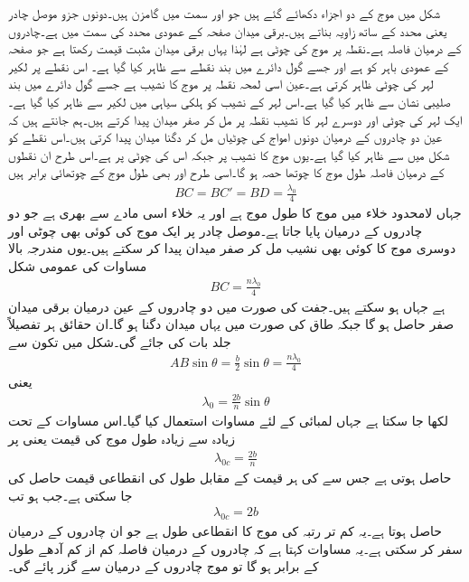 شکل  میں  موج کے دو  اجزاء دکھائے گئے ہیں جو  اور  سمت میں گامزن ہیں۔دونوں جزو موصل چادر یعنی  محدد کے ساتھ  زاویہ بناتے ہیں۔برقی میدان صفحہ کے عمودی  محدد کی سمت میں ہے۔چادروں کے درمیان فاصلہ  ہے۔نقطہ  پر موج  کی چوٹی ہے لہٰذا یہاں برقی میدان  مثبت  قیمت رکھتا ہے جو صفحہ کے عمودی باہر کو ہے اور جسے گول دائرے میں بند نقطے سے ظاہر کیا گیا ہے۔ اس نقطے پر لکیر  لہر کی چوٹی ظاہر کرتی ہے۔عین اسی لمحہ نقطہ  پر موج  کا نشیب ہے جسے گول دائرے میں بند صلیبی نشان سے ظاہر کیا گیا ہے۔اس لہر کے نشیب کو ہلکی سیاہی میں لکیر  سے ظاہر کیا گیا ہے۔ایک لہر کی چوٹی اور دوسرے لہر کا نشیب نقطہ  پر مل کر صفر میدان پیدا کرتے ہیں۔ہم جانتے ہیں کہ عین دو چادروں کے درمیان دونوں امواج کی چوٹیاں مل کر دگنا میدان پیدا کرتی ہیں۔اس نقطے کو شکل میں  سے ظاہر کیا گیا ہے۔یوں موج  کا نشیب  پر جبکہ اس کی چوٹی  پر ہے۔اس طرح ان نقطوں کے درمیان فاصلہ طول موج کا چوتھا حصہ ہو گا۔اسی طرح  اور  بھی طول موج کے چوتھائی برابر  ہیں
\begin{align}
BC=BC'=BD=\frac{\lambda_0}{4}
\end{align}
جہاں لامحدود خلاء میں  موج کا طول موج  ہے اور یہ خلاء اسی مادے سے بھری ہے جو دو چادروں کے درمیان پایا جاتا ہے۔موصل چادر پر ایک موج کی کوئی بھی چوٹی اور دوسری موج کا کوئی بھی نشیب مل کر صفر میدان پیدا کر سکتے ہیں۔یوں مندرجہ بالا مساوات کی عمومی شکل
\begin{align}\label{مساوات_مویج_چوٹی_نشیب_ختم_عمومی}
BC=\frac{n \lambda_0}{4}
\end{align}
ہے جہاں  ہو سکتے ہیں۔جفت  کی صورت میں دو چادروں کے عین درمیان برقی میدان صفر حاصل ہو گا جبکہ طاق  کی صورت میں یہاں میدان دگنا ہو گا۔ان حقائق ہر تفصیلاً جلد بات کی جائے گی۔شکل  میں تکون  سے
\begin{align*}
AB \sin \theta = \frac{b}{2}\sin \theta =\frac{n \lambda_0}{4}
\end{align*}
یعنی
\begin{align}\label{مساوات_مویج_طول_اور_درجہ_انداز}
\lambda_0 = \frac{2b}{n} \sin \theta
\end{align}
لکھا جا سکتا ہے جہاں لمبائی  کے لئے مساوات  استعمال کیا گیا۔اس مساوات کے تحت زیادہ سے زیادہ طول موج  کی قیمت  یعنی  پر
\begin{align}\label{مساوات_مویج_طول_موج_بالمقابل_درجہ_موج}
\lambda_{0c}=\frac{2b}{n}
\end{align}
 حاصل ہوتی ہے جس سے  کی ہر قیمت کے مقابل طول کی انقطاعی قیمت حاصل کی جا سکتی ہے۔جب  ہو تب
 \begin{align}\label{مساوات_مویج_دو_چادر_انقطاعی_طول_موج}
\lambda_{0c}=2b
\end{align}
حاصل ہوتا ہے۔یہ کم تر رتبہ کی  موج کا انقطاعی طول ہے جو ان چادروں کے درمیان سفر کر سکتی ہے۔یہ مساوات کہتا ہے کہ چادروں کے درمیان فاصلہ کم از کم آدھے طول کے برابر ہو گا تو موج چادروں کے درمیان سے گزر پائے گی۔

